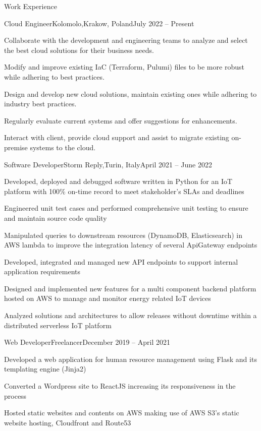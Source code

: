 \documentclass[a4paper]{article}
\newlength{\tabin}
\newlength{\secsep}
\newcommand{\lineunder}{\vspace*{-8pt}\\\hspace*{-6pt}\hrulefill\\\vspace*{-15pt}}
\newenvironment{tabbedsection}[1]{
  \begin{list}{}{
    \setlength{\itemsep}{0pt}
    \setlength{\labelsep}{0pt}
    \setlength{\labelwidth}{0pt}
    \setlength{\leftmargin}{\tabin}
    \setlength{\rightmargin}{\tabin}
    \setlength{\listparindent}{0pt}
    \setlength{\parsep}{0pt}
    \setlength{\parskip}{0pt}
    \setlength{\partopsep}{0pt}
    \setlength{\topsep}{#1}
  }
  \item[]
}{\end{list}}
\newenvironment{resume_section}[1]{
  \filbreak
  \vspace{2\secsep}
  \textsc{\large#1}
  \lineunder
  \begin{tabbedsection}{\secsep}
}{\end{tabbedsection}}
\newenvironment{subitems}{
  \renewcommand{\labelitemi}{-}
  \begin{itemize}
  \setlength{\labelsep}{1em}
}{\end{itemize}}
\newenvironment{resume_employer}[4]{
  \vspace{\secsep}
  \textbf{#1 \hfill #4} \\ 
  \textit{\small #2 #3}
  \begin{tabbedsection}{0pt}
  \begin{subitems}
}{\end{subitems}\end{tabbedsection}}
\begin{document}
\begin{resume_section}{Work Experience}
  \begin{resume_employer}{Cloud Engineer}{Kolomolo,}{Krakow, Poland}{July 2022 -- Present}
    \item Collaborate with the development and engineering teams to analyze and select the best cloud solutions for their business needs.
    \item Modify and improve existing IaC (Terraform, Pulumi) files to be more robust while adhering to best practices.
    \item Design and develop new cloud solutions, maintain existing ones while adhering to industry best practices.
    \item Regularly evaluate current systems and offer suggestions for enhancements.
    \item Interact with client, provide cloud support and assist to migrate existing on-premise systems to the cloud.
  \end{resume_employer}

  \begin{resume_employer}{Software Developer}{Storm Reply,}{Turin, Italy}{April 2021 -- June 2022}
    \item Developed, deployed and debugged software written in Python for an IoT platform with 100\% on-time record to meet stakeholder's SLAs and deadlines
    \item Engineered unit test cases and performed comprehensive unit testing to ensure and maintain source code quality
    \item Manipulated queries to downstream resources (DynamoDB, Elasticsearch) in AWS lambda to improve the integration latency of several ApiGateway endpoints
    \item Developed, integrated and managed new API endpoints to support internal application requirements
    \item Designed and implemented new features for a multi component backend platform hosted on AWS to manage and monitor energy related IoT devices
    \item Analyzed solutions and architectures to allow releases without downtime within a distributed serverless IoT platform
  \end{resume_employer}

  \begin{resume_employer}{Web Developer}{Freelancer}{}{December 2019 -- April 2021}
    \item Developed a web application for human resource management using Flask and its templating engine (Jinja2)
    \item Converted a Wordpress site to ReactJS increasing its responsiveness in the process
    \item Hosted static websites and contents on AWS making use of AWS S3's static website hosting, Cloudfront and Route53
  \end{resume_employer}
\end{resume_section}
\end{document}
